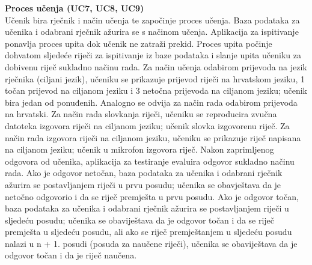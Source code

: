 				\textbf{Proces učenja (UC7, UC8, UC9)}\\
					{Učenik bira rječnik i način učenja te započinje proces učenja. Baza podataka za učenika i odabrani rječnik ažurira se s načinom učenja. Aplikacija za ispitivanje ponavlja proces upita dok učenik ne zatraži prekid. Proces upita počinje dohvatom sljedeće riječi za ispitivanje iz baze podataka i slanje upita učeniku za dobivenu riječ sukladno načinu rada. Za način učenja odabirom prijevoda na jezik rječnika (ciljani jezik), učeniku se prikazuje prijevod riječi na hrvatskom jeziku, 1 točan prijevod na ciljanom jeziku i 3 netočna prijevoda na ciljanom jeziku; učenik bira jedan od ponuđenih. Analogno se odvija za način rada odabirom prijevoda na hrvatski. Za način rada slovkanja riječi, učeniku se reproducira zvučna datoteka izgovora riječi na ciljanom jeziku; učenik slovka izgovorenu riječ. Za način rada izgovora riječi na ciljanom jeziku, učeniku se prikazuje riječ napisana na ciljanom jeziku; učenik u mikrofon izgovora riječ. Nakon zaprimljenog odgovora od učenika, aplikacija za testiranje evaluira odgovor sukladno načinu rada. Ako je odgovor netočan, baza podataka za učenika i odabrani rječnik ažurira se postavljanjem riječi u prvu posudu; učenika se obavještava da je netočno odgovorio i da se riječ premješta u prvu posudu. Ako je odgovor točan, baza podataka za učenika i odabrani rječnik ažurira se postavljanjem riječi u sljedeću posudu; učenika se obaviještava da je odgovor točan i da se riječ premješta u sljedeću posudu, ali ako se riječ premještanjem u sljedeću posudu nalazi u n + 1. posudi (posuda za naučene riječi), učenika se obaviještava da je odgovor točan i da je riječ naučena.}
				
